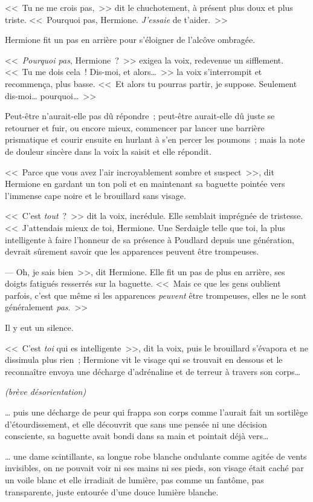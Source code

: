 <<~Tu ne me crois pas,~>> dit le chuchotement, à présent plus doux et plus triste. <<~Pourquoi pas, Hermione. \emph{J'essaie} de t'aider.~>>

Hermione fit un pas en arrière pour s'éloigner de l'alcôve ombragée.

<<~\emph{Pourquoi pas}, Hermione~?~>> exigea la voix, redevenue un sifflement. <<~Tu me dois cela~! Dis-moi, et alors…~>> la voix s'interrompit et recommença, plus basse. <<~Et alors tu pourras partir, je suppose. Seulement dis-moi… pourquoi…~>>

Peut-être n'aurait-elle pas dû répondre~; peut-être aurait-elle dû juste se retourner et fuir, ou encore mieux, commencer par lancer une barrière prismatique et courir ensuite en hurlant à s'en percer les poumons~; mais la note de douleur sincère dans la voix la saisit et elle répondit.

<<~Parce que vous avez l'air incroyablement sombre et suspect~>>, dit Hermione en gardant un ton poli et en maintenant sa baguette pointée vers l'immense cape noire et le brouillard sans visage.

<<~C'est \emph{tout}~?~>> dit la voix, incrédule. Elle semblait imprégnée de tristesse. <<~J'attendais mieux de toi, Hermione. Une Serdaigle telle que toi, la plus intelligente à faire l'honneur de sa présence à Poudlard depuis une génération, devrait sûrement savoir que les apparences peuvent être trompeuses.

--- Oh, je sais bien~>>, dit Hermione. Elle fit un pas de plus en arrière, ses doigts fatigués resserrés sur la baguette. <<~Mais ce que les gens oublient parfois, c'est que même si les apparences \emph{peuvent} être trompeuses, elles ne le sont généralement \emph{pas}.~>>

Il y eut un silence.

<<~C'est \emph{toi} qui es intelligente~>>, dit la voix, puis le brouillard s'évapora et ne dissimula plus rien~; Hermione vit le visage qui se trouvait en dessous et le reconnaître envoya une décharge d'adrénaline et de terreur à travers son corps…

\emph{(brève désorientation)}

… puis une décharge de peur qui frappa son corps comme l'aurait fait un sortilège d'étourdissement, et elle découvrit que sans une pensée ni une décision consciente, sa baguette avait bondi dans sa main et pointait déjà vers…

… une dame scintillante, sa longue robe blanche ondulante comme agitée de vents invisibles, on ne pouvait voir ni ses mains ni ses pieds, son visage était caché par un voile blanc et elle irradiait de lumière, pas comme un fantôme, pas transparente, juste entourée d'une douce lumière blanche.

